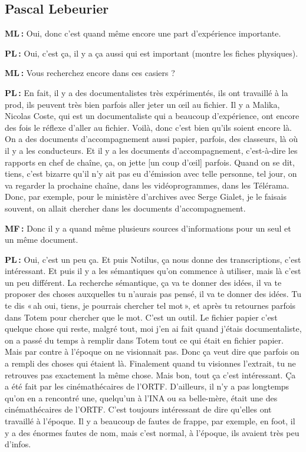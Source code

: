 \subsection*{Pascal Lebeurier }

\textbf{ML :} Oui, donc c'est quand même encore une part d'expérience importante. 

\textbf{PL :} Oui, c'est ça, il y a ça aussi qui est important (montre les fiches physiques). 

\textbf{ML :} Vous recherchez encore dans ces casiers ? 

\textbf{PL :} En fait, il y a des documentalistes très expérimentés, ils ont travaillé à la prod, ils peuvent très bien parfois aller jeter un œil au fichier. Il y a Malika, Nicolas Coste, qui est un documentaliste qui a beaucoup d'expérience, ont encore des fois le réflexe d'aller au fichier.  Voilà, donc c'est bien qu'ils soient encore là. On a des documents d'accompagnement aussi papier, parfois, des classeurs, là où il y a les conducteurs. Et il y a les documents d'accompagnement, c'est-à-dire les rapports en chef de chaîne, ça, on jette [un coup d’œil] parfois.  Quand on se dit, tiens, c'est bizarre qu'il n'y ait pas eu d'émission avec telle personne, tel jour, on va regarder la prochaine chaîne, dans les vidéoprogrammes, dans les Télérama. Donc, par exemple, pour le ministère d'archives avec Serge Gialet, je le faisais souvent, on allait chercher dans les documents d'accompagnement. 

\textbf{MF :} Donc il y a quand même plusieurs sources d'informations pour un seul et un même document. 

\textbf{PL :} Oui, c'est un peu ça. Et puis Notilus, ça nous donne des transcriptions, c'est intéressant.  Et puis il y a les sémantiques qu'on commence à utiliser, mais là c'est un peu différent. La recherche sémantique, ça va te donner des idées, il va te proposer des choses auxquelles tu n'aurais pas pensé, il va te donner des idées. Tu te dis « ah oui, tiens, je pourrais chercher tel mot », et après tu retournes parfois dans Totem pour chercher que le mot. C'est un outil. Le fichier papier c'est quelque chose qui reste, malgré tout, moi j'en ai fait quand j'étais documentaliste, on a passé du temps à remplir dans Totem tout ce qui était en fichier papier.  Mais par contre à l'époque on ne visionnait pas. Donc ça veut dire que parfois on a rempli des choses qui étaient là. Finalement quand tu visionnes l'extrait, tu ne retrouves pas exactement la même chose. Mais bon, tout ça c'est intéressant. Ça a été fait par les cinémathécaires de l'ORTF. D'ailleurs, il n'y a pas longtemps qu'on en a rencontré une, quelqu'un à l’INA ou sa belle-mère, était une des cinémathécaires de l’ORTF. C'est toujours intéressant de dire qu'elles ont travaillé à l'époque. Il y a beaucoup de fautes de frappe, par exemple, en foot, il y a des énormes fautes de nom, mais c'est normal, à l'époque, ils avaient très peu d'infos. 

